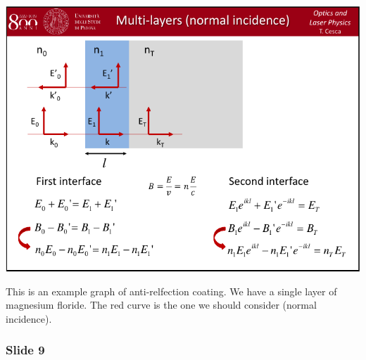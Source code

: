 \documentclass[../main/main.tex]{subfiles}
\begin{document}
\begin{minipage}[]{0.5\linewidth}
\centering
\includegraphics[page=8,width=1\textwidth]{../lessons/pdf_file/06_lecture.pdf}
\end{minipage}
\hspace{0.3cm}\vspace{0.3cm}
\begin{minipage}[c]{0.47\linewidth}

This is an example graph of anti-relfection coating. We have a single layer of magnesium floride. The red curve is the one we should consider (normal incidence).

\end{minipage}

\subsubsection*{Slide 9}
\end{document}
